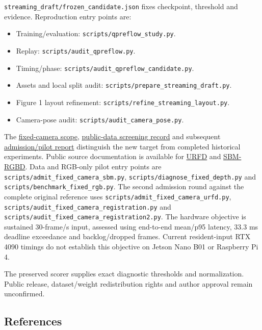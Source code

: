 \documentclass[
  10pt,
]{article}
\providecommand{\tightlist}{%
  \setlength{\itemsep}{0pt}\setlength{\parskip}{0pt}}
\begin{document}
\texttt{streaming\_draft/frozen\_candidate.json} fixes checkpoint,
threshold and evidence. Reproduction entry points are:

\begin{itemize}
\tightlist
\item
  Training/evaluation: \texttt{scripts/qpreflow\_study.py}.
\item
  Replay: \texttt{scripts/audit\_qpreflow.py}.
\item
  Timing/phase: \texttt{scripts/audit\_qpreflow\_candidate.py}.
\item
  Assets and local split audit:
  \texttt{scripts/prepare\_streaming\_draft.py}.
\item
  Figure 1 layout refinement:
  \texttt{scripts/refine\_streaming\_layout.py}.
\item
  Camera-pose audit: \texttt{scripts/audit\_camera\_pose.py}.
\end{itemize}

The \href{streaming_draft/FIXED_CAMERA_SCOPE.md}{fixed-camera scope},
\href{streaming_draft/PUBLIC_DATASET_SCREENING.md}{public-data screening
record} and subsequent
\href{streaming_draft/FIXED_CAMERA_VALIDATION.md}{admission/pilot
report} distinguish the new target from completed historical
experiments. Public source documentation is available for
\href{https://fenix.ur.edu.pl/~mkepski/ds/uf.html}{URFD} and
\href{https://rgbd2017.na.icar.cnr.it/SBM-RGBDdataset.html}{SBM-RGBD}.
Data and RGB-only pilot entry points are
\texttt{scripts/admit\_fixed\_camera\_sbm.py},
\texttt{scripts/diagnose\_fixed\_depth.py} and
\texttt{scripts/benchmark\_fixed\_rgb.py}. The second admission round
against the complete original reference uses
\texttt{scripts/admit\_fixed\_camera\_urfd.py},
\texttt{scripts/audit\_fixed\_camera\_registration.py} and
\texttt{scripts/audit\_fixed\_camera\_registration2.py}. The hardware
objective is sustained 30-frame/s input, assessed using end-to-end
mean/p95 latency, 33.3 ms deadline exceedance and backlog/dropped
frames. Current resident-input RTX 4090 timings do not establish this
objective on Jetson Nano B01 or Raspberry Pi 4.

The preserved scorer supplies exact diagnostic thresholds and
normalization. Public release, dataset/weight redistribution rights and
author approval remain unconfirmed.

\subsection{References}\label{references}
\end{document}
